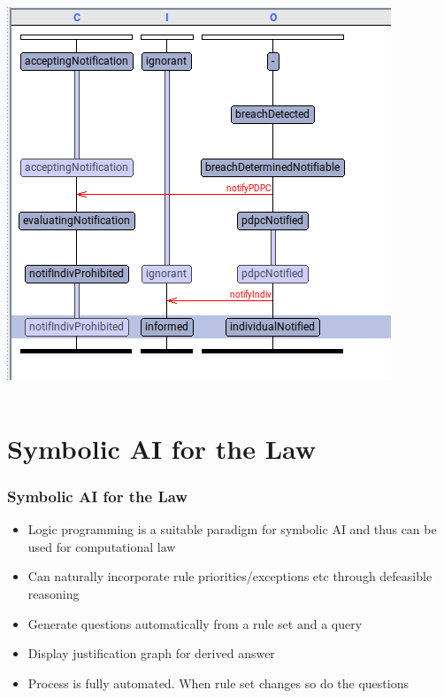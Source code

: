 \documentclass{beamer}
\begin{document}
\begin{frame}[fragile]
\begin{columns}
\begin{center}
    \includegraphics[scale=0.35]{Figures/uppaal_swimlane.png}
  \end{center}
\end{columns}

\end{frame}



\section{Symbolic AI for the Law}


\begin{frame}[fragile]\frametitle{Symbolic AI for the Law}

\begin{itemize}
\item Logic programming is a suitable paradigm for symbolic AI and thus can be used for computational law
\item Can naturally incorporate rule priorities/exceptions etc through defeasible reasoning
\end{itemize}

\vspace{4mm}
\begin{itemize}
\item Generate questions automatically from a rule set and a query
\item Display justification graph for derived answer
\item Process is fully automated. When rule set changes so do the questions
\end{itemize}

\end{frame}



\end{document}
